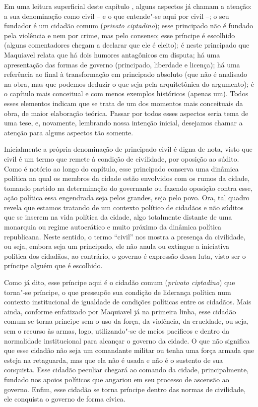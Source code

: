 Em uma leitura superficial deste capítulo , alguns aspectos já chamam
a atenção: a sua denominação como civil -- e o que entende"-se aqui por
civil --; o seu fundador é um cidadão comum (\emph{privato ciptadino});
esse principado não é fundado pela violência e nem por crime, mas pelo
consenso; esse príncipe é escolhido (alguns comentadores chegam a
declarar que ele é eleito); é neste principado que Maquiavel relata que
há dois humores antagônicos em disputa; há uma apresentação das formas
de governo (principado, liberdade e licença); há uma referência ao final
à transformação em principado absoluto (que não é analisado na obra, mas
que podemos deduzir o que seja pela arquitetônica do argumento); é o
capítulo mais conceitual e com menos exemplos históricos (apenas um).
Todos esses elementos indicam que se trata de um dos momentos mais
conceituais da obra, de maior elaboração teórica. Passar por todos esses
aspectos seria tema de uma tese, e, novamente, lembrando nossa intenção
inicial, desejamos chamar a atenção para alguns aspectos tão somente.

Inicialmente a própria denominação de principado civil é digna de nota,
visto que civil é um termo que remete à condição de civilidade, por
oposição ao súdito. Como é notório ao longo do capítulo, esse principado
conserva uma dinâmica política na qual os membros da cidade estão
envolvidos com os rumos da cidade, tomando partido na determinação do
governante ou fazendo oposição contra esse, ação política essa
engendrada seja pelos grandes, seja pelo povo. Ora, tal quadro revela
que estamos tratando de um contexto político de cidadãos e não súditos
que se inserem na vida política da cidade, algo totalmente distante de
uma monarquia ou regime autocrático e muito próximo da dinâmica política
republicana. Neste sentido, o termo ``civil'' nos mostra a presença da
civilidade, ou seja, embora seja um principado, ele não anula ou
extingue a iniciativa política dos cidadãos, ao contrário, o governo é
expressão dessa luta, visto ser o príncipe alguém que é escolhido.

Como já dito, esse príncipe aqui é o cidadão comum (\emph{privato
ciptadino}) que torna"-se príncipe, o que pressupõe sua condição de
liderança política num contexto institucional de igualdade de condições
políticas entre os cidadãos. Mais ainda, conforme enfatizado por
Maquiavel já na primeira linha, esse cidadão comum se torna príncipe sem
o uso da força, da violência, da crueldade, ou seja, sem o recurso às
armas, logo, utilizando"-se de meios pacíficos e dentro da normalidade
institucional para alcançar o governo da cidade. O que não significa que
esse cidadão não seja um comandante militar ou tenha uma força armada
que esteja na retaguarda, mas que ela não é usada e não é o sustento de
sua conquista. Esse cidadão peculiar chegará ao comando da cidade,
principalmente, fundado nos apoios políticos que angariou em seu
processo de ascensão ao governo. Enfim, esse cidadão se torna príncipe
dentro das normas de civilidade, ele conquista o governo de forma
cívica.

